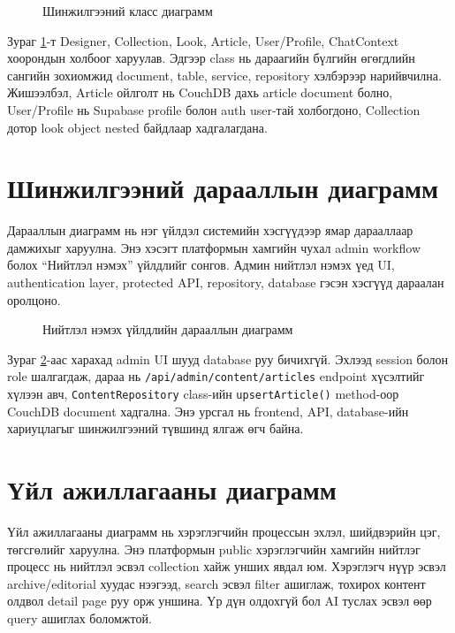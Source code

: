 \begin{figure}[htbp]
  \centering
  \resizebox{\textwidth}{!}{}
  \caption[Шинжилгээний класс диаграмм]{Шинжилгээний класс диаграмм}
  \label{fig:ch2-analysis-class}
\end{figure}

Зураг \ref{fig:ch2-analysis-class}-т Designer, Collection, Look, Article, User/Profile, ChatContext хоорондын холбоог харуулав. Эдгээр class нь дараагийн бүлгийн өгөгдлийн сангийн зохиомжид document, table, service, repository хэлбэрээр нарийвчилна. Жишээлбэл, Article ойлголт нь CouchDB дахь article document болно, User/Profile нь Supabase profile болон auth user-тай холбогдоно, Collection дотор look object nested байдлаар хадгалагдана.

\section{Шинжилгээний дарааллын диаграмм}
Дарааллын диаграмм нь нэг үйлдэл системийн хэсгүүдээр ямар дарааллаар дамжихыг харуулна. Энэ хэсэгт платформын хамгийн чухал admin workflow болох ``Нийтлэл нэмэх'' үйлдлийг сонгов. Админ нийтлэл нэмэх үед UI, authentication layer, protected API, repository, database гэсэн хэсгүүд дараалан оролцоно.

\begin{figure}[htbp]
  \centering
  \resizebox{\textwidth}{!}{}
  \caption[Нийтлэл нэмэх үйлдлийн дарааллын диаграмм]{Нийтлэл нэмэх үйлдлийн дарааллын диаграмм}
  \label{fig:ch2-sequence-article-create}
\end{figure}

Зураг \ref{fig:ch2-sequence-article-create}-аас харахад admin UI шууд database руу бичихгүй. Эхлээд session болон role шалгагдаж, дараа нь \texttt{/api/admin/content/articles} endpoint хүсэлтийг хүлээн авч, \texttt{ContentRepository} class-ийн \texttt{upsertArticle()} method-оор CouchDB document хадгална. Энэ урсгал нь frontend, API, database-ийн хариуцлагыг шинжилгээний түвшинд ялгаж өгч байна.

\section{Үйл ажиллагааны диаграмм}
Үйл ажиллагааны диаграмм нь хэрэглэгчийн процессын эхлэл, шийдвэрийн цэг, төгсгөлийг харуулна. Энэ платформын public хэрэглэгчийн хамгийн нийтлэг процесс нь нийтлэл эсвэл collection хайж унших явдал юм. Хэрэглэгч нүүр эсвэл archive/editorial хуудас нээгээд, search эсвэл filter ашиглаж, тохирох контент олдвол detail page руу орж уншина. Үр дүн олдохгүй бол AI туслах эсвэл өөр query ашиглах боломжтой.

